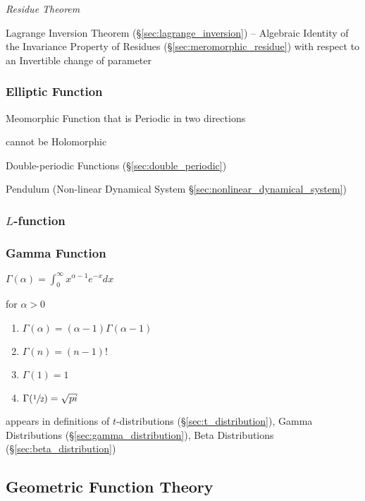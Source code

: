 \emph{Residue Theorem}

Lagrange Inversion Theorem (\S\ref{sec:lagrange_inversion}) -- Algebraic
Identity of the Invariance Property of Residues
(\S\ref{sec:meromorphic_residue}) with respect to an Invertible change of
parameter



\subsubsection{Elliptic Function}\label{sec:elliptic_function}

Meomorphic Function that is Periodic in two directions

cannot be Holomorphic

Double-periodic Functions (\S\ref{sec:double_periodic})

Pendulum (Non-linear Dynamical System \S\ref{sec:nonlinear_dynamical_system})



\subsubsection{$L$-function}\label{sec:l_function}

\subsubsection{Gamma Function}\label{sec:gamma_function}

$\Gamma(\alpha) = \int_0^{\infty} x^{\alpha -1} e^{-x} dx$

for $\alpha > 0$

\begin{enumerate}
\item $\Gamma(\alpha) = (\alpha - 1) \Gamma(\alpha -1)$
\item $\Gamma(n) = (n-1)!$
\item $\Gamma(1) = 1$
\item $\Gamma(\sfrac{1}{2}) = \sqrt{pi}$
\end{enumerate}

appears in definitions of $t$-distributions (\S\ref{sec:t_distribution}), Gamma
Distributions (\S\ref{sec:gamma_distribution}), Beta Distributions
(\S\ref{sec:beta_distribution})



\subsection{Geometric Function Theory}\label{sec:geometric_function_theory}

